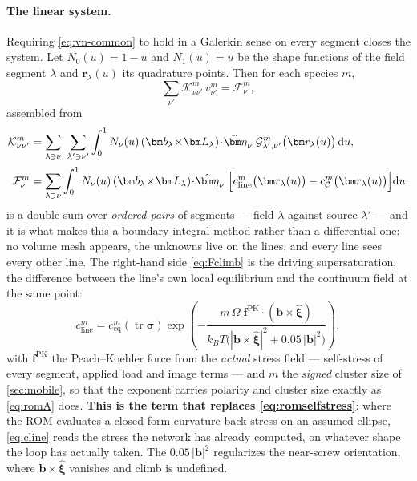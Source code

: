 \documentclass{article}
\newcommand{\bvec}{\bm b}
\begin{document}
\paragraph{The linear system.} Requiring \cref{eq:vn-common} to hold in a
Galerkin sense on every segment closes the system. Let $N_0(u)=1-u$ and
$N_1(u)=u$ be the shape functions of the field segment $\lambda$ and
$\bm r_\lambda(u)$ its quadrature points. Then for each species $m$,
\begin{equation}
  \sum_{\nu'}\mathcal K^m_{\nu\nu'}\,v^m_{\nu'}=\mathcal F^m_{\nu},
  \label{eq:climbsystem}
\end{equation}
assembled from
\begin{align}
  \mathcal K^m_{\nu\nu'}
    &=\sum_{\lambda\ni\nu}\ \sum_{\lambda'\ni\nu'}\int_0^1
      N_{\nu}(u)\,(\bvec_\lambda\!\times\!\bm L_\lambda)\!\cdot\!\hat{\bm\eta}_\nu\;
      \mathcal G^{m}_{\lambda',\nu'}\bigl(\bm r_\lambda(u)\bigr)\,\mathrm du,
  \label{eq:Kclimb}\\[2pt]
  \mathcal F^m_{\nu}
    &=\sum_{\lambda\ni\nu}\int_0^1
      N_{\nu}(u)\,(\bvec_\lambda\!\times\!\bm L_\lambda)\!\cdot\!\hat{\bm\eta}_\nu\;
      \Bigl[c^{m}_{\mathrm{line}}\bigl(\bm r_\lambda(u)\bigr)
           -c^{m}_{\mathcal C}\bigl(\bm r_\lambda(u)\bigr)\Bigr]\mathrm du .
  \label{eq:Fclimb}
\end{align}
 is a double sum over \emph{ordered pairs} of segments --- field
$\lambda$ against source $\lambda'$ --- and it is what makes this a
boundary-integral method rather than a differential one: no volume mesh appears,
the unknowns live on the lines, and every line sees every other line. The
right-hand side \cref{eq:Fclimb} is the driving supersaturation, the difference
between the line's own local equilibrium and the continuum field at the same
point:
\begin{equation}
  c^{m}_{\mathrm{line}}=c^{m}_{\mathrm{eq}}(\operatorname{tr}\bm\sigma)
   \exp\!\left(-\frac{m\,\Omega\;
     \bm f^{\mathrm{PK}}\!\cdot\!(\bvec\times\hat{\bm\xi})}
     {k_BT\bigl(|\bvec\times\hat{\bm\xi}|^{2}+0.05\,|\bvec|^{2}\bigr)}\right),
  \label{eq:cline}
\end{equation}
with $\bm f^{\mathrm{PK}}$ the Peach--Koehler force from the \emph{actual} stress
field --- self-stress of every segment, applied load and image terms --- and
$m$ the \emph{signed} cluster size of \cref{sec:mobile}, so that the exponent
carries polarity and cluster size exactly as \cref{eq:romA} does.
\textbf{This is the term that replaces
\cref{eq:romselfstress}}: where the ROM evaluates a closed-form curvature back
stress on an assumed ellipse, \cref{eq:cline} reads the stress the network has
already computed, on whatever shape the loop has actually taken. The
$0.05\,|\bvec|^{2}$ regularizes the near-screw orientation, where
$\bvec\times\hat{\bm\xi}$ vanishes and climb is undefined.
\end{document}
